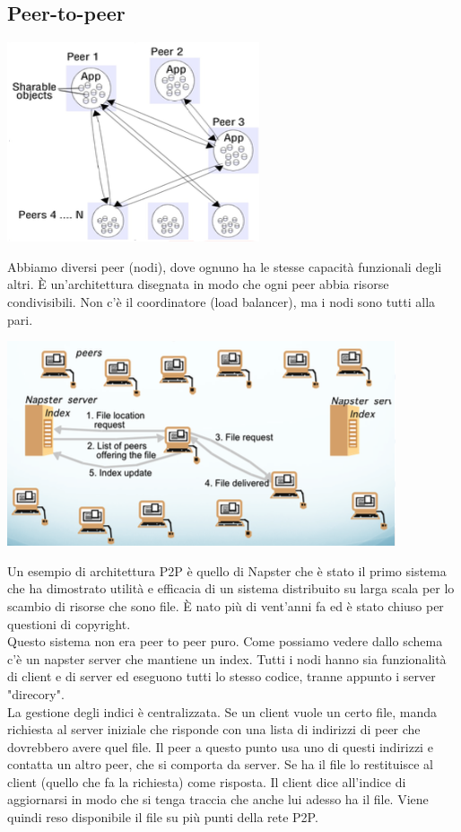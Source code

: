 \subsection{Peer-to-peer}
\begin{center}
    \includegraphics[width = .4\textwidth]{images/lezione2/P2P.png}
\end{center}
Abbiamo diversi peer (nodi), dove ognuno ha le stesse capacità funzionali degli altri. È un'architettura disegnata in modo che ogni peer abbia risorse condivisibili. Non c'è il coordinatore (load balancer), ma i nodi sono tutti alla pari.
\begin{center}
    \includegraphics[width = .6\textwidth]{images/lezione2/napster.png}
\end{center}
Un esempio di architettura P2P è quello di Napster che è stato il primo sistema che ha dimostrato utilità e efficacia di un sistema distribuito su larga scala per lo scambio di risorse che sono file. È nato più di vent'anni fa ed è stato chiuso per questioni di copyright. \\
Questo sistema non era peer to peer puro. Come possiamo vedere dallo schema c'è un napster server che mantiene un index. Tutti i nodi hanno sia funzionalità di client e di server ed eseguono tutti lo stesso codice, tranne appunto i server "direcory". \\ La gestione degli indici è centralizzata. Se un client vuole un certo file, manda richiesta al server iniziale che risponde con una lista di indirizzi di peer che dovrebbero avere quel file. Il peer a questo punto usa uno di questi indirizzi e contatta un altro peer, che si comporta da server. Se ha il file lo restituisce al client (quello che fa la richiesta) come risposta. Il client dice all'indice di aggiornarsi in modo che si tenga traccia che anche lui adesso ha il file. Viene quindi reso disponibile il file su più punti della rete P2P.\\\\

